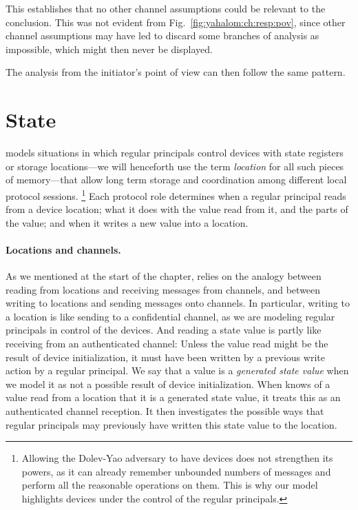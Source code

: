 This establishes that no other channel assumptions could be relevant
to the conclusion.  This was not evident from
Fig.~\ref{fig:yahalom:ch:resp:pov}, since other channel assumptions
may have led {\cpsa} to discard some branches of analysis as
impossible, which might then never be displayed.

The analysis from the initiator's point of view can then follow the
same pattern.

\section{State}
\label{sec:channels:state:state}

{\cpsa} models situations in which regular principals control devices
with state registers or storage locations---we will henceforth use the
term \emph{location} for all such pieces of memory---that allow long
term storage and coordination among different local protocol sessions.%
%
\footnote{Allowing the Dolev-Yao adversary to have devices does not
  strengthen its powers, as it can already remember unbounded numbers
  of messages and perform all the reasonable operations on them.  This
  is why our model highlights devices under the control of the regular
  principals.}
%
Each protocol role determines when a regular principal reads from a
device location; what it does with the value read from it, and the
parts of the value; and when it writes a new value into a location.

\paragraph{Locations and channels.}  As we mentioned at the start of
the chapter, {\cpsa} relies on the analogy between reading from
locations and receiving messages from channels, and between writing to
locations and sending messages onto channels.  In particular, writing
to a location is like sending to a confidential channel, as we are
modeling regular principals in control of the devices.  And reading a
state value is partly like receiving from an authenticated channel:
Unless the value read might be the result of device initialization, it
must have been written by a previous write action by a regular
principal.  We say that a value is a \emph{generated state value} when
we model it as not a possible result of device initialization.  When
{\cpsa} knows of a value read from a location that it is a generated
state value, it treats this as an authenticated channel reception.  It
then investigates the possible ways that regular principals may
previously have written this state value to the location.

